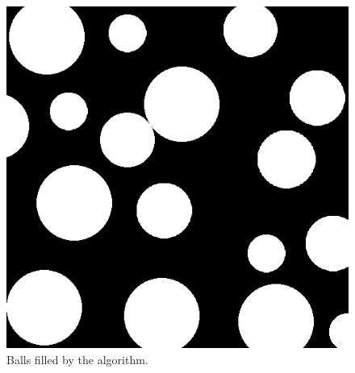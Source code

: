 \begin{figure}[]
    \centering
    \includegraphics[width=1.00\textwidth]{figures/image_processed/balls-with-reflections-filled.png}
    \caption{Balls filled by the algorithm. }
    \label{fig:balls_with_reflections_filled}
\end{figure}
